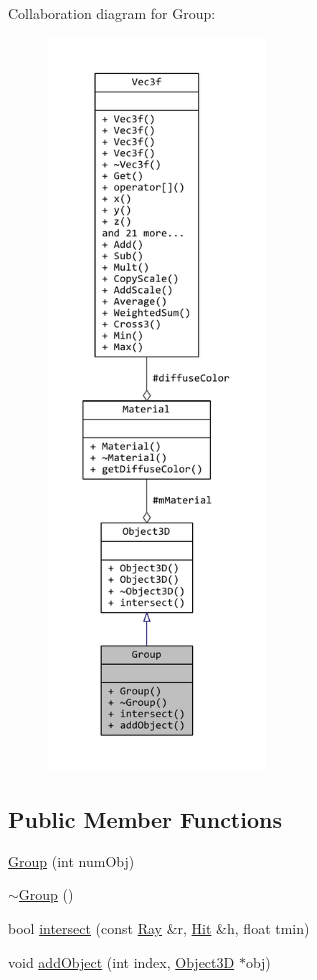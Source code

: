 Collaboration diagram for Group\+:
\nopagebreak
\begin{figure}[H]
\begin{center}
\leavevmode
\includegraphics[height=550pt]{classGroup__coll__graph}
\end{center}
\end{figure}
\subsection*{Public Member Functions}
\begin{DoxyCompactItemize}
\item 
\hyperlink{classGroup_aa8b46062ab10d8142daf419be2073c1c}{Group} (int num\+Obj)
\item 
\hyperlink{classGroup_aed00a22ff227ee2657ae44a5cbcedf7c}{$\sim$\+Group} ()
\item 
bool \hyperlink{classGroup_aa09c8e6bce2db3666c1bae2c2fd9688b}{intersect} (const \hyperlink{classRay}{Ray} \&r, \hyperlink{classHit}{Hit} \&h, float tmin)
\item 
void \hyperlink{classGroup_a08dfa34262ba52b8ccf23da53b8482ac}{add\+Object} (int index, \hyperlink{classObject3D}{Object3\+D} $\ast$obj)
\end{DoxyCompactItemize}
